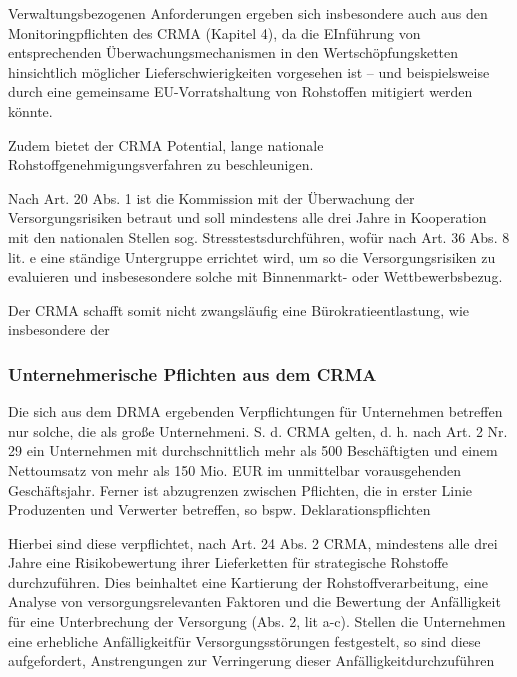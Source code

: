 \documentclass[12pt,a4paper,oneside]{book} %
\begin{document}
Verwaltungsbezogenen Anforderungen ergeben sich insbesondere auch aus den Monitoringpflichten des CRMA (Kapitel 4), da die EInführung von entsprechenden Überwachungsmechanismen in den Wertschöpfungsketten hinsichtlich möglicher Lieferschwierigkeiten vorgesehen ist -- und beispielsweise durch eine gemeinsame EU-Vorratshaltung von Rohstoffen mitigiert werden könnte.

Zudem bietet der CRMA Potential, lange nationale Rohstoffgenehmigungsverfahren zu beschleunigen.\autocite{Frenz 2025, S. 92}

Nach Art. 20 Abs. 1 ist die Kommission mit der Überwachung der Versorgungsrisiken betraut und soll mindestens alle drei Jahre in Kooperation mit den nationalen Stellen sog. \glqq Stresstests\grqq durchführen, wofür nach Art. 36 Abs. 8 lit. e eine ständige Untergruppe errichtet wird, um so die Versorgungsrisiken zu evaluieren und insbesesondere solche mit Binnenmarkt- oder Wettbewerbsbezug.

Der CRMA schafft somit nicht zwangsläufig eine Bürokratieentlastung, wie insbesondere der 

\subsubsection{Unternehmerische Pflichten aus dem CRMA}

Die sich aus dem DRMA ergebenden Verpflichtungen für Unternehmen betreffen nur solche, die als \glqq große Unternehmen\grqq i. S. d. CRMA gelten, d. h. nach Art. 2 Nr. 29 \glqq ein Unternehmen mit durchschnittlich mehr als 500 Beschäftigten und einem Nettoumsatz von mehr als 150 Mio. EUR im unmittelbar vorausgehenden Geschäftsjahr\grqq. Ferner ist abzugrenzen zwischen Pflichten, die in erster Linie Produzenten und Verwerter betreffen, so bspw. Deklarationspflichten

Hierbei sind diese verpflichtet, nach Art. 24 Abs. 2 CRMA, mindestens alle drei Jahre eine Risikobewertung ihrer Lieferketten für strategische Rohstoffe durchzuführen. Dies beinhaltet eine Kartierung der Rohstoffverarbeitung, eine Analyse von versorgungsrelevanten Faktoren und die Bewertung der Anfälligkeit für eine Unterbrechung der Versorgung (Abs. 2, lit a-c). Stellen die Unternehmen eine \glqq erhebliche Anfälligkeit\grqq für Versorgungsstörungen festgestelt, so sind diese aufgefordert, \glqq Anstrengungen zur Verringerung dieser Anfälligkeit\grqq durchzuführen
\end{document}
